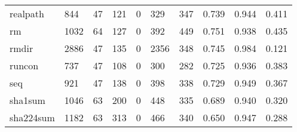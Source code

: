 \begin{longtable}{lp{2.0cm}p{2.0cm}p{2.0cm}p{2.0cm}p{2.0cm}p{2.0cm}p{2.0cm}p{2.0cm}p{2.0cm}}
realpath  &                    844 &                                 47 &                               121 &                                0 &                               329 &                             347 &                                0.739 &                                  0.944 &                                0.411 \\
rm        &                   1032 &                                 64 &                               127 &                                0 &                               392 &                             449 &                                0.751 &                                  0.938 &                                0.435 \\
rmdir     &                   2886 &                                 47 &                               135 &                                0 &                              2356 &                             348 &                                0.745 &                                  0.984 &                                0.121 \\
runcon    &                    737 &                                 47 &                               108 &                                0 &                               300 &                             282 &                                0.725 &                                  0.936 &                                0.383 \\
seq       &                    921 &                                 47 &                               138 &                                0 &                               398 &                             338 &                                0.729 &                                  0.949 &                                0.367 \\
sha1sum   &                   1046 &                                 63 &                               200 &                                0 &                               448 &                             335 &                                0.689 &                                  0.940 &                                0.320 \\
sha224sum &                   1182 &                                 63 &                               313 &                                0 &                               466 &                             340 &                                0.650 &                                  0.947 &                                0.288 \\

\end{longtable}
